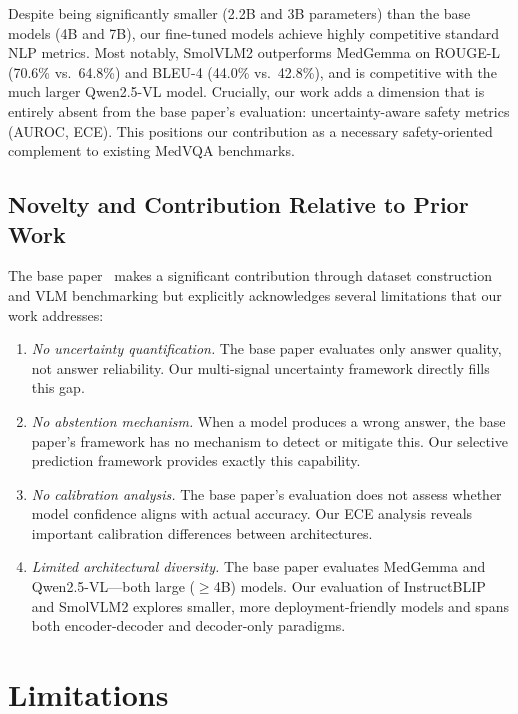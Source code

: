 \documentclass[pdflatex,sn-mathphys-num]{sn-jnl}
\begin{document}
Despite being significantly smaller (2.2B and 3B parameters) than the base models (4B and 7B), our fine-tuned models achieve highly competitive standard NLP metrics. Most notably, SmolVLM2 outperforms MedGemma on ROUGE-L (70.6\% vs.\ 64.8\%) and BLEU-4 (44.0\% vs.\ 42.8\%), and is competitive with the much larger Qwen2.5-VL model. Crucially, our work adds a dimension that is entirely absent from the base paper's evaluation: uncertainty-aware safety metrics (AUROC, ECE). This positions our contribution as a necessary safety-oriented complement to existing MedVQA benchmarks.

\subsection{Novelty and Contribution Relative to Prior Work}

The base paper~\cite{gautam2025kvasirx1} makes a significant contribution through dataset construction and VLM benchmarking but explicitly acknowledges several limitations that our work addresses:

\begin{enumerate}
    \item \textit{No uncertainty quantification.} The base paper evaluates only answer quality, not answer reliability. Our multi-signal uncertainty framework directly fills this gap.
    \item \textit{No abstention mechanism.} When a model produces a wrong answer, the base paper's framework has no mechanism to detect or mitigate this. Our selective prediction framework provides exactly this capability.
    \item \textit{No calibration analysis.} The base paper's evaluation does not assess whether model confidence aligns with actual accuracy. Our ECE analysis reveals important calibration differences between architectures.
    \item \textit{Limited architectural diversity.} The base paper evaluates MedGemma and Qwen2.5-VL---both large ($\geq$4B) models. Our evaluation of InstructBLIP and SmolVLM2 explores smaller, more deployment-friendly models and spans both encoder-decoder and decoder-only paradigms.
\end{enumerate}

\section{Limitations}\label{sec:limitations}
\end{document}
